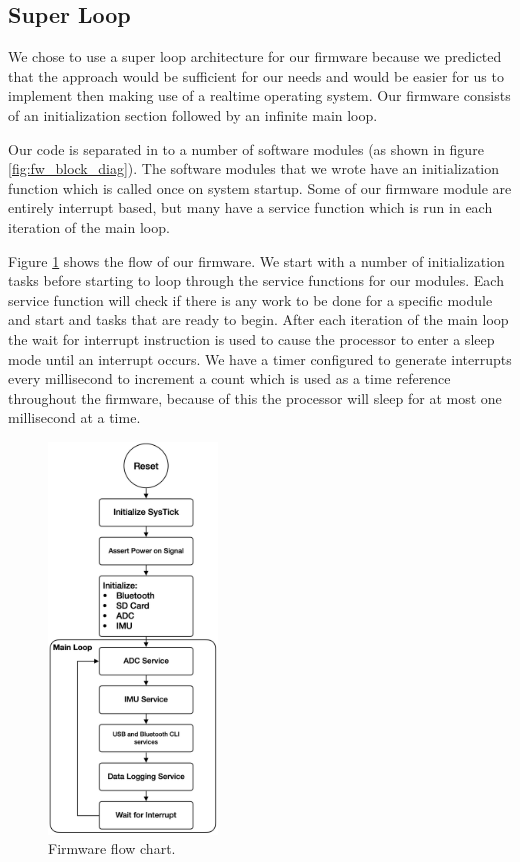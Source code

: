 \subsection{Super Loop}

We chose to use a super loop architecture for our firmware because we predicted
that the approach would be sufficient for our needs and would be easier for us
to implement then making use of a realtime operating system. Our firmware
consists of an initialization section followed by an infinite main loop.

Our code is separated in to a number of software modules (as shown in figure
\ref{fig:fw_block_diag}). The software modules that we wrote have an
initialization function which is called once on system startup. Some of our
firmware module are entirely interrupt based, but many have a service function
which is run in each iteration of the main loop.

Figure \ref{fig:fw_flow} shows the flow of our firmware. We start with a number
of initialization tasks before starting to loop through the service functions
for our modules. Each service function will check if there is any work to be
done for a specific module and start and tasks that are ready to begin. After
each iteration of the main loop the wait for interrupt instruction is used to
cause the processor to enter a sleep mode until an interrupt occurs. We have a
timer configured to generate interrupts every millisecond to increment a count
which is used as a time reference throughout the firmware, because of this the
processor will sleep for at most one millisecond at a time.

\begin{figure}[!htb]
\centering
\includegraphics[width=0.4\textwidth]{images/fw_flow.png}
\caption{Firmware flow chart.}
\label{fig:fw_flow}
\end{figure}

